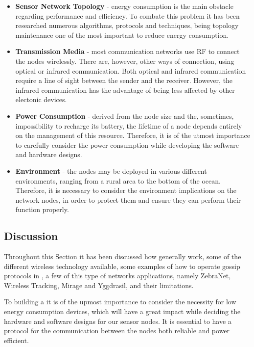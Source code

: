 \begin{itemize}
\begin{figure}[H]
                  \label{fig:sensor_components}
            \end{figure}
      \item \textbf{Sensor Network Topology} - energy consumption is the main obstacle regarding
             performance and efficiency. To combate this problem it has been
            researched numerous algorithms, protocols and techniques, being topology maintenance
            one of the most important to reduce energy consumption.
      \item \textbf{Transmission Media} - most communication networks use \Gls{RF} to connect
            the nodes wirelessly. There are, however, other ways of connection, using optical or
            infrared communication. Both optical and infrared communication require a line of
            sight between the sender and the receiver. However, the infrared communication has
            the advantage of being less affected by other electonic devices.
      \item \textbf{Power Consumption} - derived from the node size and the, sometimes,
            impossibility to recharge its battery, the lifetime of a node depends entirely
            on the management of this resource. Therefore, it is of the utmost importance to
            carefully consider the power consumption while developing the software and hardware
            designs.
      \item \textbf{Environment} - the nodes may be deployed in various different environments,
            ranging from a rural area to the bottom of the ocean. Therefore, it is necessary to
            consider the environment implications on the network nodes, in order to protect them
            and ensure they can perform their function properly.
\end{itemize}


\subsection{Discussion}
Throughout this Section it has been discussed how  generally work,  some of the
different wireless technology available, some examples of how to operate gossip protocols in
, a few of this type of networks applications, namely ZebraNet, Wireless Tracking,
Mirage and Yggdrasil, and their limitations.

To building a  it is of the upmost importance to consider the necessity for low
energy consumption devices, which will have a great impact while deciding the hardware
and software designs for our sensor nodes. It is essential to have a protocol for the
communication between the nodes both reliable and power efficient.

